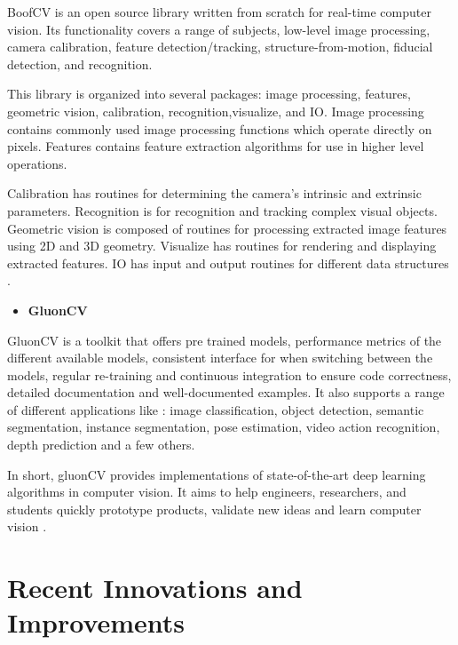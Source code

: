     BoofCV is an open source library written from scratch for real-time computer vision. Its functionality covers a range of subjects, low-level image processing, camera calibration, feature detection/tracking, structure-from-motion, fiducial detection, and recognition. \par
	This library is organized into several packages: image processing, features, geometric vision, calibration, recognition,visualize, and IO. Image processing contains commonly used image processing functions which operate directly on pixels. Features contains feature extraction algorithms for use in higher level operations. \par Calibration has routines for determining the camera's intrinsic and extrinsic parameters. Recognition is for recognition and tracking complex visual objects. Geometric vision is composed of routines for processing extracted image features using 2D and 3D geometry. Visualize has routines for rendering and displaying extracted features. IO has input and output routines for different data structures \cite{boofcvweb}.

    \begin{itemize}
        \item \textbf{GluonCV}
    \end{itemize}

    GluonCV is a toolkit that offers pre trained models, performance metrics of the different available models, consistent interface for when switching between the models, regular re-training and continuous integration to ensure code correctness, detailed documentation and well-documented examples. It also supports a range of different applications like : image classification, object detection, semantic segmentation, instance segmentation, pose estimation, video action recognition, depth prediction and a few others.

   In short, gluonCV provides implementations of state-of-the-art deep learning algorithms in computer vision. It aims to help engineers, researchers, and students quickly prototype products, validate new ideas and learn computer vision \cite{Guo2019}.

    

\newpage   


\section{Recent Innovations and Improvements}
\label{sec:state}

